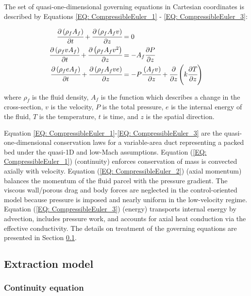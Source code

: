 \documentclass[a4paper,fleqn]{cas-dc}
\begin{document}
The set of quasi-one-dimensional governing equations in Cartesian coordinates is described by Equations \ref{EQ: CompressibleEuler_1} - \ref{EQ: CompressibleEuler_3}:

{\footnotesize
	\begin{align}
		\label{EQ: CompressibleEuler_1}
		\cfrac{\partial \left( \rho_f A_f \right) }{\partial t} + \cfrac{\partial \left( \rho_f A_f v \right)}{\partial z} &= 0 \\
		\cfrac{\partial \left( \rho_f v A_f \right) }{\partial t} + \cfrac{\partial \left( \rho_f A_f v^2 \right)}{\partial z} &= -A_f \cfrac{\partial P}{\partial z} \label{EQ: CompressibleEuler_2} \\
		\cfrac{\partial \left( \rho_f e A_f \right) }{\partial t} + \cfrac{\partial \left( \rho_f A_f v e\right)}{\partial z} &= -P\cfrac{\left( A_f v \right)}{\partial z} + \cfrac{\partial}{\partial z} \left( k \cfrac{\partial T}{\partial z} \right)   
		\label{EQ: CompressibleEuler_3}
	\end{align}  
}

where $\rho_f$ is the fluid density, $A_f$ is the function which describes a change in the cross-section, $v$ is the velocity, $P$ is the total pressure, $e$ is the internal energy of the fluid, $T$ is the temperature, $t$ is time, and $z$ is the spatial direction.

Equation \ref{EQ: CompressibleEuler_1}-\ref{EQ: CompressibleEuler_3} are the quasi-one-dimensional conservation laws for a variable-area duct representing a packed bed under the quasi-1D and low-Mach assumptions. Equation (\ref{EQ: CompressibleEuler_1}) (continuity) enforces conservation of mass is convected axially with velocity. Equation (\ref{EQ: CompressibleEuler_2}) (axial momentum) balances the momentum of the fluid parcel with the pressure gradient. The viscous wall/porous drag and body forces are neglected in the control-oriented model because pressure is imposed and nearly uniform in the low-velocity regime. Equation (\ref{EQ: CompressibleEuler_3}) (energy) transports internal energy by advection, includes pressure work, and accounts for axial heat conduction via the effective conductivity. The details on treatment of the governing equations are presented in Section \ref{CH: Extraction_model}.

\subsection{Extraction model} \label{CH: Extraction_model}
\subsubsection{Continuity equation} \label{CH: Continuity}
\end{document}
